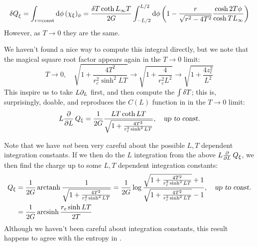 \documentclass[11pt,a4paper]{article}
\begin{document}
	\begin{equation}
		\var{Q}_\xi
		= \int_{r = \mrm{const}} \dd{\phi} (\chi_\xi)_\phi
		= \frac{\var{T} \coth L_\infty T}{2G}
			\int_{-L/2}^{L/2} \dd{\phi}
			\pqty{
				1 - {\frac{r}{\sqrt{r^2 - 4T^2}}}
				\frac{\cosh 2T\phi}{\cosh TL_\infty}
			}
	\end{equation}
	 However, as $T\to 0$ they are the same. 
	
	
	We haven't found a nice way to compute this integral directly, but we note that the magical square root factor appears again in the $T\to 0$ limit:
	\begin{equation}
		T\to 0,
	\quad
		\sqrt{
			1 + \frac{4T^2}{r_c^2 \sinh^2 LT}
		}
		\to \sqrt{
			1 + \frac{4}{r_c^2 L^2}
		}
		\to \sqrt{
			1 + \frac{4z_c^2}{L^2}
		}
	\end{equation}
	This inspire us to take $L\partial_{L}$ first, and then compute the $\int \var{T}$; this is, surprisingly, doable, and reproduces the $C(L)$ function in \textcite{Lewkowycz:2019xse} in the $T \to 0$ limit:
	\begin{equation}
		L \pdv{L}\,Q_\xi
		= \frac{1}{2G}
			\frac{LT \coth LT}{\sqrt{
				1 + \frac{4T^2}{r_c^2 \sinh^2 LT}
			}},
	\quad\textsl{up to const.}
	\end{equation}
	
	Note that we have \textit{not} been very careful about the possible $L,T$ dependent integration constants. If we then do the $L$ integration from the above $L \pdv{L}\,Q_\xi$, we then find the charge up to some $L,T$ dependent integration constants:
	\begin{equation}
	\begin{aligned}
		Q_\xi
		&= \frac{1}{2G} \operatorname{arctanh}
			\frac{1}{\sqrt{
				1 + \frac{4T^2}{r_c^2 \sinh^2 LT}
			}}
		= \frac{1}{2G} \log
			\frac{
				\sqrt{
					1 + \frac{4T^2}{r_c^2 \sinh^2 LT}
				} + 1
			}{
				\sqrt{
					1 + \frac{4T^2}{r_c^2 \sinh^2 LT}
				} - 1
			},
	\quad\textsl{up to const.} \\
		&= \frac{1}{2G} \operatorname{arcsinh}
			\frac{r_c \sinh LT}{2T}
	\end{aligned}
	\end{equation}
	Although we haven't been careful about integration constants, this result happens to agree with the entropy in \cite{Lewkowycz:2019xse}. 
	
	
\appendix
\end{document}
